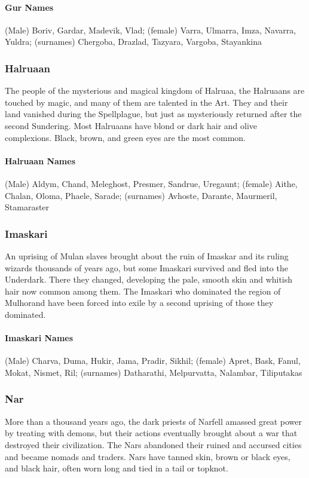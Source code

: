 \documentclass[10pt,a4paper,twoside,twocolumn,openany,bg=print,nodeprecatedcode]{dndbook}
\begin{document}
\paragraph{Gur Names}
(Male) Boriv, Gardar, Madevik, Vlad; (female) Varra, Ulmarra, Imza, Navarra, Yuldra; (surnames) Chergoba, Drazlad, Tazyara, Vargoba, Stayankina
\subsubsection{Halruaan}
The people of the mysterious and magical kingdom of Halruaa, the Halruaans are touched by magic, and many of them are talented in the Art. They and their land vanished during the Spellplague, but just as mysteriously returned after the second Sundering. Most Halruaans have blond or dark hair and olive complexions. Black, brown, and green eyes are the most common.
\paragraph{Halruaan Names}
(Male) Aldym, Chand, Meleghost, Presmer, Sandrue, Uregaunt; (female) Aithe, Chalan, Oloma, Phaele, Sarade; (surnames) Avhoste, Darante, Maurmeril, Stamaraster
\subsubsection{Imaskari}
An uprising of Mulan slaves brought about the ruin of Imaskar and its ruling wizards thousands of years ago, but some Imaskari survived and fled into the Underdark. There they changed, developing the pale, smooth skin and whitish hair now common among them. The Imaskari who dominated the region of Mulhorand have been forced into exile by a second uprising of those they dominated.
\paragraph{Imaskari Names}
(Male) Charva, Duma, Hukir, Jama, Pradir, Sikhil; (female) Apret, Bask, Fanul, Mokat, Nismet, Ril; (surnames) Datharathi, Melpurvatta, Nalambar, Tiliputakas
\subsubsection{Nar}
More than a thousand years ago, the dark priests of Narfell amassed great power by treating with demons, but their actions eventually brought about a war that destroyed their civilization. The Nars abandoned their ruined and accursed cities and became nomads and traders. Nars have tanned skin, brown or black eyes, and black hair, often worn long and tied in a tail or topknot.
\end{document}
